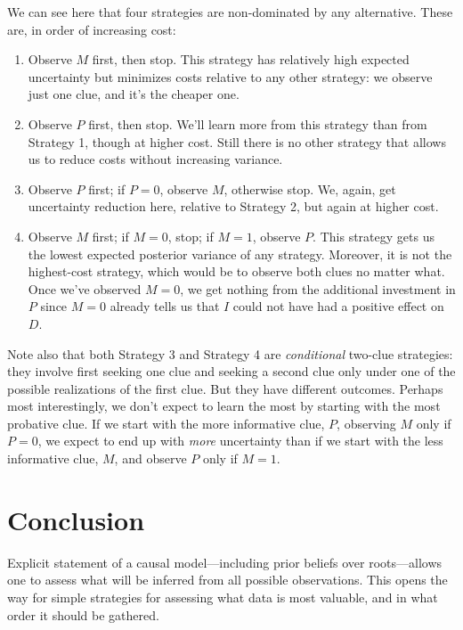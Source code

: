 \documentclass[
  12pt,
]{book}
\providecommand{\tightlist}{%
  \setlength{\itemsep}{0pt}\setlength{\parskip}{0pt}}
\begin{document}
We can see here that four strategies are non-dominated by any alternative. These are, in order of increasing cost:

\begin{enumerate}
\def\labelenumi{\arabic{enumi}.}
\tightlist
\item
  Observe \(M\) first, then stop. This strategy has relatively high expected uncertainty but minimizes costs relative to any other strategy: we observe just one clue, and it's the cheaper one.
\item
  Observe \(P\) first, then stop. We'll learn more from this strategy than from Strategy 1, though at higher cost. Still there is no other strategy that allows us to reduce costs without increasing variance.
\item
  Observe \(P\) first; if \(P=0\), observe \(M\), otherwise stop. We, again, get uncertainty reduction here, relative to Strategy 2, but again at higher cost.
\item
  Observe \(M\) first; if \(M=0\), stop; if \(M=1\), observe \(P\). This strategy gets us the lowest expected posterior variance of any strategy. Moreover, it is not the highest-cost strategy, which would be to observe both clues no matter what. Once we've observed \(M=0\), we get nothing from the additional investment in \(P\) since \(M=0\) already tells us that \(I\) could not have had a positive effect on \(D\).
\end{enumerate}

Note also that both Strategy 3 and Strategy 4 are \emph{conditional} two-clue strategies: they involve first seeking one clue and seeking a second clue only under one of the possible realizations of the first clue. But they have different outcomes. Perhaps most interestingly, we don't expect to learn the most by starting with the most probative clue. If we start with the more informative clue, \(P\), observing \(M\) only if \(P=0\), we expect to end up with \emph{more} uncertainty than if we start with the less informative clue, \(M\), and observe \(P\) only if \(M=1\).

\hypertarget{conclusion}{%
\section{Conclusion}\label{conclusion}}

Explicit statement of a causal model---including prior beliefs over roots---allows one to assess what will be inferred from all possible observations. This opens the way for simple strategies for assessing what data is most valuable, and in what order it should be gathered.
\end{document}
